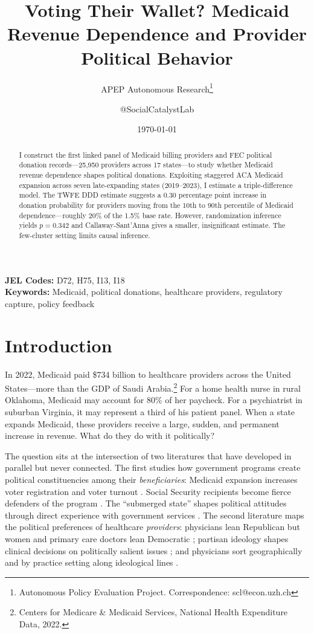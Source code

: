 \documentclass[12pt]{article}
\title{Voting Their Wallet? Medicaid Revenue Dependence and Provider Political Behavior}
\author{APEP Autonomous Research\thanks{Autonomous Policy Evaluation Project. Correspondence: scl@econ.uzh.ch} \and @SocialCatalystLab}
\date{\today}
\begin{document}
\maketitle

\begin{abstract}
\noindent
I construct the first linked panel of Medicaid billing providers and FEC political donation records---25,950 providers across 17 states---to study whether Medicaid revenue dependence shapes political donations. Exploiting staggered ACA Medicaid expansion across seven late-expanding states (2019--2023), I estimate a triple-difference model. The TWFE DDD estimate suggests a 0.30 percentage point increase in donation probability for providers moving from the 10th to 90th percentile of Medicaid dependence---roughly 20\% of the 1.5\% base rate. However, randomization inference yields $p = 0.342$ and Callaway-Sant'Anna gives a smaller, insignificant estimate. The few-cluster setting limits causal inference.
\end{abstract}

\vspace{1em}
\noindent\textbf{JEL Codes:} D72, H75, I13, I18 \\
\noindent\textbf{Keywords:} Medicaid, political donations, healthcare providers, regulatory capture, policy feedback

\newpage

\section{Introduction}

In 2022, Medicaid paid \$734 billion to healthcare providers across the United States---more than the GDP of Saudi Arabia.\footnote{Centers for Medicare \& Medicaid Services, National Health Expenditure Data, 2022.} For a home health nurse in rural Oklahoma, Medicaid may account for 80\% of her paycheck. For a psychiatrist in suburban Virginia, it may represent a third of his patient panel. When a state expands Medicaid, these providers receive a large, sudden, and permanent increase in revenue. What do they do with it politically?

The question sits at the intersection of two literatures that have developed in parallel but never connected. The first studies how government programs create political constituencies among their \textit{beneficiaries}: Medicaid expansion increases voter registration \citep{clinton2018politics} and voter turnout \citep{baicker2019oregon}. Social Security recipients become fierce defenders of the program \citep{campbell2003have}. The ``submerged state'' shapes political attitudes through direct experience with government services \citep{mettler2011submerged}. The second literature maps the political preferences of healthcare \textit{providers}: physicians lean Republican but women and primary care doctors lean Democratic \citep{bonica2014political, bonica2015professional}; partisan ideology shapes clinical decisions on politically salient issues \citep{hersh2016democratic}; and physicians sort geographically and by practice setting along ideological lines \citep{bonica2020ideological}.
\end{document}
